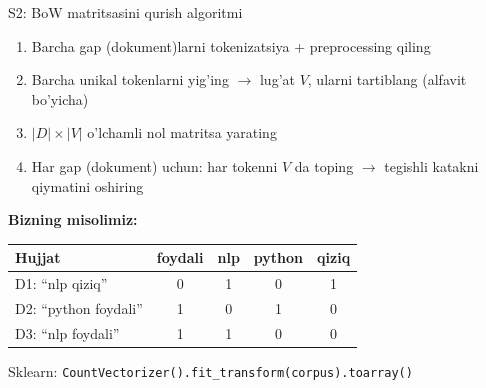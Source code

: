 \documentclass[aspectratio=169,11pt]{beamer}
\begin{document}
\begin{frame}{S2: BoW matritsasini qurish algoritmi}
  \begin{enumerate}\small\setlength\itemsep{5pt}
    \item Barcha gap (dokument)larni tokenizatsiya + preprocessing qiling
    \item Barcha unikal tokenlarni yig'ing $\to$ lug'at $V$,
          ularni tartiblang (alfavit bo'yicha)
    \item $|D| \times |V|$ o'lchamli nol matritsa yarating
    \item Har gap (dokument) uchun: har tokenni $V$ da toping $\to$
          tegishli katakni qiymatini oshiring
  \end{enumerate}
  \vspace{4pt}
  \textbf{Bizning misolimiz:}
  \begin{center}\small
  \begin{tabular}{lcccc}
    \toprule
    Hujjat & foydali & nlp & python & qiziq \\
    \midrule
    D1: ``nlp qiziq''      & 0 & 1 & 0 & 1 \\
    D2: ``python foydali'' & 1 & 0 & 1 & 0 \\
    D3: ``nlp foydali''    & 1 & 1 & 0 & 0 \\
    \bottomrule
  \end{tabular}
  \end{center}
  \vspace{3pt}
  \footnotesize Sklearn: \texttt{CountVectorizer().fit\_transform(corpus).toarray()}
\end{frame}
\end{document}
